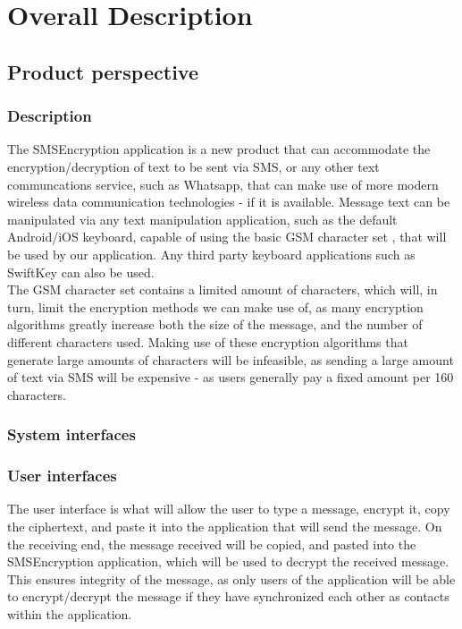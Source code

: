 \section{Overall Description}

\subsection{Product perspective}

\subsubsection{Description}
The SMSEncryption application is a new product that can accommodate the encryption/decryption of text to be sent via SMS, or any other text communcations service, such as Whatsapp, that can make use of more modern wireless data communication technologies - if it is available. Message text can be manipulated via any text manipulation application, such as the default Android/iOS keyboard, capable of using the basic GSM character set , that will be used by our application. Any third party keyboard applications such as SwiftKey can also be used.
\vspace{12pt}\\
The GSM character set contains a limited amount of characters, which will, in turn, limit the encryption methods we can make use of, as many encryption algorithms greatly increase both the size of the message, and the number of different characters used. Making use of these encryption algorithms that generate large amounts of characters will be infeasible, as sending a large amount of text via SMS will be expensive - as users generally pay a fixed amount per 160 characters.
\subsubsection{System interfaces}

\subsubsection{User interfaces}
 The user interface is what will allow the user to type a message, encrypt it, copy the ciphertext, and paste it into the application that will send the message. On the receiving end, the message received will be copied, and pasted into the SMSEncryption application, which will be used to decrypt the received message. This ensures integrity of the message, as only users of the application will be able to encrypt/decrypt the message if they have synchronized each other as contacts within the application.
